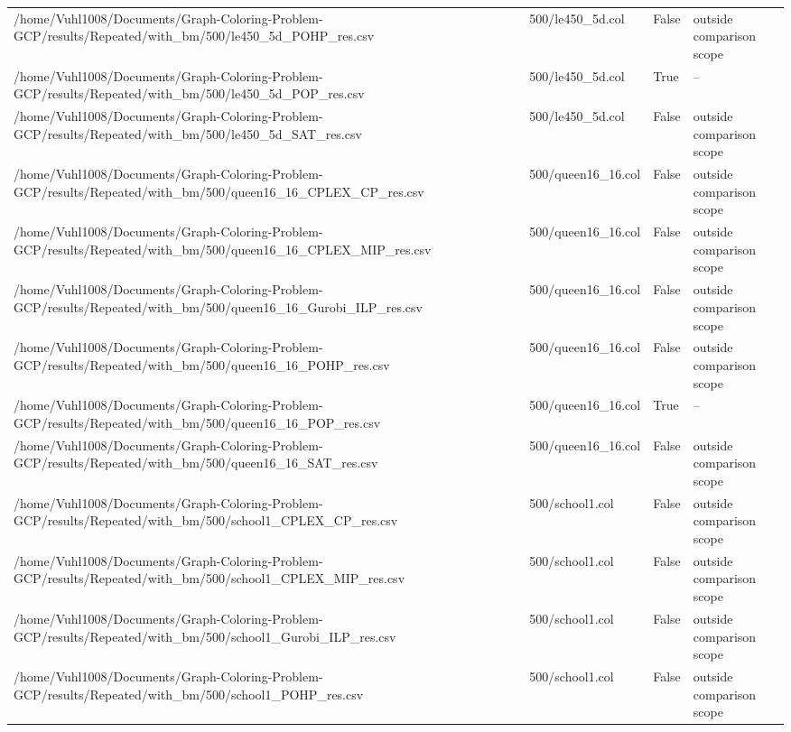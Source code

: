 \begin{table}[htbp]
\begin{tabular}{llll}
/home/Vuhl1008/Documents/Graph-Coloring-Problem-GCP/results/Repeated/with\_bm/500/le450\_5d\_POHP\_res.csv & 500/le450\_5d.col & False & outside comparison scope \\
/home/Vuhl1008/Documents/Graph-Coloring-Problem-GCP/results/Repeated/with\_bm/500/le450\_5d\_POP\_res.csv & 500/le450\_5d.col & True & -- \\
/home/Vuhl1008/Documents/Graph-Coloring-Problem-GCP/results/Repeated/with\_bm/500/le450\_5d\_SAT\_res.csv & 500/le450\_5d.col & False & outside comparison scope \\
/home/Vuhl1008/Documents/Graph-Coloring-Problem-GCP/results/Repeated/with\_bm/500/queen16\_16\_CPLEX\_CP\_res.csv & 500/queen16\_16.col & False & outside comparison scope \\
/home/Vuhl1008/Documents/Graph-Coloring-Problem-GCP/results/Repeated/with\_bm/500/queen16\_16\_CPLEX\_MIP\_res.csv & 500/queen16\_16.col & False & outside comparison scope \\
/home/Vuhl1008/Documents/Graph-Coloring-Problem-GCP/results/Repeated/with\_bm/500/queen16\_16\_Gurobi\_ILP\_res.csv & 500/queen16\_16.col & False & outside comparison scope \\
/home/Vuhl1008/Documents/Graph-Coloring-Problem-GCP/results/Repeated/with\_bm/500/queen16\_16\_POHP\_res.csv & 500/queen16\_16.col & False & outside comparison scope \\
/home/Vuhl1008/Documents/Graph-Coloring-Problem-GCP/results/Repeated/with\_bm/500/queen16\_16\_POP\_res.csv & 500/queen16\_16.col & True & -- \\
/home/Vuhl1008/Documents/Graph-Coloring-Problem-GCP/results/Repeated/with\_bm/500/queen16\_16\_SAT\_res.csv & 500/queen16\_16.col & False & outside comparison scope \\
/home/Vuhl1008/Documents/Graph-Coloring-Problem-GCP/results/Repeated/with\_bm/500/school1\_CPLEX\_CP\_res.csv & 500/school1.col & False & outside comparison scope \\
/home/Vuhl1008/Documents/Graph-Coloring-Problem-GCP/results/Repeated/with\_bm/500/school1\_CPLEX\_MIP\_res.csv & 500/school1.col & False & outside comparison scope \\
/home/Vuhl1008/Documents/Graph-Coloring-Problem-GCP/results/Repeated/with\_bm/500/school1\_Gurobi\_ILP\_res.csv & 500/school1.col & False & outside comparison scope \\
/home/Vuhl1008/Documents/Graph-Coloring-Problem-GCP/results/Repeated/with\_bm/500/school1\_POHP\_res.csv & 500/school1.col & False & outside comparison scope \\

\end{tabular}
\end{table}
